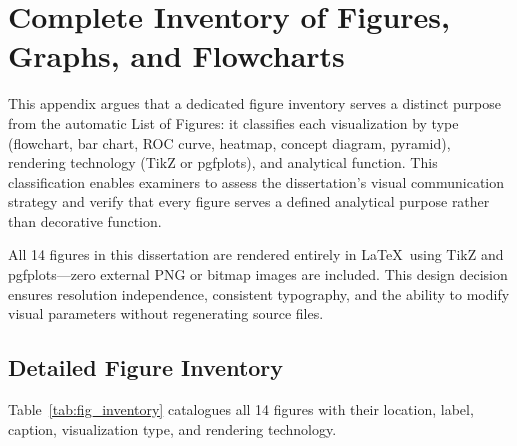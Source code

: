 
\chapter{Complete Inventory of Figures, Graphs, and Flowcharts}
\label{app:figure_inventory}

This appendix argues that a dedicated figure inventory serves a distinct purpose from the automatic List of Figures: it classifies each visualization by type (flowchart, bar chart, ROC curve, heatmap, concept diagram, pyramid), rendering technology (TikZ or pgfplots), and analytical function. This classification enables examiners to assess the dissertation's visual communication strategy and verify that every figure serves a defined analytical purpose rather than decorative function.

All 14 figures in this dissertation are rendered entirely in \LaTeX\ using TikZ and pgfplots---zero external PNG or bitmap images are included. This design decision ensures resolution independence, consistent typography, and the ability to modify visual parameters without regenerating source files.

\tablefontsize %

\section{Detailed Figure Inventory}
\label{sec:fig_inventory_detail}

\noindent Table~\ref{tab:fig_inventory} catalogues all 14 figures with their location, label, caption, visualization type, and rendering technology.


